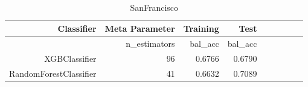 
\begin{table}[H]
    \caption{SanFrancisco}
    \centering
    \begin{tabular}{|r|r|r|r|r|r|r|r|r|}
        \hline
        Classifier &Meta Parameter
        &Training
        &Test\\
        \hline
        &n\_estimators
        &bal\_acc
        &bal\_acc\\
        \hline
        XGBClassifier &96 &0.6766 &0.6790\\
        \hline
        RandomForestClassifier &41 &0.6632 &0.7089\\
        \hline
    \end{tabular}
\end{table}
